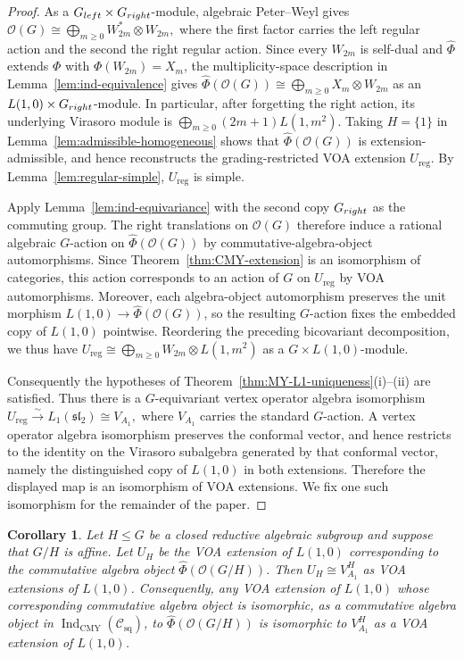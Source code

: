 \documentclass[10pt,a4paper]{amsart}
\numberwithin{equation}{section} \newtheorem{thm}{Theorem}[section] \newtheorem{lem}[thm]{Lemma} \newtheorem{ex}[thm]{Example} \newtheorem{prop}[thm]{Proposition} \newtheorem{cor}[thm]{Corollary} \newtheorem{defi}[thm]{Definition} \newtheorem{rmk}[thm]{Remark} \newtheorem{notation}[thm]{Notation}
\newcommand{\OO}{\mathcal O}
\newcommand{\Csq}{\mathcal C_{\mathrm{sq}}}
\newcommand{\IndCMY}{\operatorname{Ind}_{\mathrm{CMY}}}
\begin{document}
\begin{proof}
As a $G_{\rm left}\times G_{\rm right}$-module, algebraic Peter--Weyl gives \(\OO(G)\cong\bigoplus_{m\ge0}W_{2m}^*\otimes W_{2m},\) where the first factor carries the left regular action and the second the right regular action. Since every $W_{2m}$ is self-dual and $\widehat\Phi$ extends $\Phi$ with $\Phi(W_{2m})=X_m$, the multiplicity-space description in Lemma~\ref{lem:ind-equivalence} gives \(\widehat\Phi(\OO(G))\cong\bigoplus_{m\ge0}X_m\otimes W_{2m}\) as an $L(1,0)\times G_{\rm right}$-module. In particular, after forgetting the right action, its underlying Virasoro module is \(\bigoplus_{m\ge0}(2m+1)L(1,m^2).\) Taking $H=\{1\}$ in Lemma~\ref{lem:admissible-homogeneous} shows that $\widehat\Phi(\OO(G))$ is extension-admissible, and hence reconstructs the grading-restricted VOA extension $U_{\mathrm{reg}}$. By Lemma~\ref{lem:regular-simple}, $U_{\mathrm{reg}}$ is simple.

Apply Lemma~\ref{lem:ind-equivariance} with the second copy $G_{\rm right}$ as the commuting group. The right translations on $\OO(G)$ therefore induce a rational algebraic $G$-action on $\widehat\Phi(\OO(G))$ by commutative-algebra-object automorphisms. Since Theorem~\ref{thm:CMY-extension} is an isomorphism of categories, this action corresponds to an action of $G$ on $U_{\mathrm{reg}}$ by VOA automorphisms. Moreover, each algebra-object automorphism preserves the unit morphism $L(1,0)\to\widehat\Phi(\OO(G))$, so the resulting $G$-action fixes the embedded copy of $L(1,0)$ pointwise. Reordering the preceding bicovariant decomposition, we thus have \(U_{\mathrm{reg}}\cong\bigoplus_{m\ge0}W_{2m}\otimes L(1,m^2)\) as a $G\times L(1,0)$-module.

Consequently the hypotheses of Theorem~\ref{thm:MY-L1-uniqueness}\textnormal{(i)--(ii)} are satisfied. Thus there is a $G$-equivariant vertex operator algebra isomorphism \(U_{\mathrm{reg}}\overset\sim\longrightarrow L_1(\mathfrak{sl}_2)\cong V_{A_1},\) where $V_{A_1}$ carries the standard $G$-action. A vertex operator algebra isomorphism preserves the conformal vector, and hence restricts to the identity on the Virasoro subalgebra generated by that conformal vector, namely the distinguished copy of $L(1,0)$ in both extensions. Therefore the displayed map is an isomorphism of VOA extensions. We fix one such isomorphism for the remainder of the paper.
\end{proof}

\begin{cor}\label{cor:fixed-point-dictionary}
Let $H\le G$ be a closed reductive algebraic subgroup and suppose that $G/H$ is affine. Let $U_H$ be the VOA extension of $L(1,0)$ corresponding to the commutative algebra object \(\widehat\Phi(\OO(G/H))\). Then \(U_H\cong V_{A_1}^{H}\) as VOA extensions of $L(1,0)$. Consequently, any VOA extension of $L(1,0)$ whose corresponding commutative algebra object is isomorphic, as a commutative algebra object in $\IndCMY(\Csq)$, to \(\widehat\Phi(\OO(G/H))\) is isomorphic to $V_{A_1}^{H}$ as a VOA extension of $L(1,0)$.
\end{cor}
\end{document}
